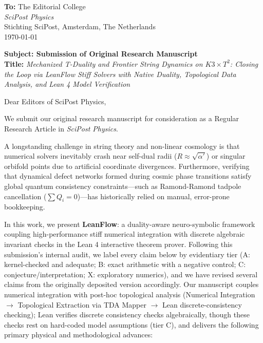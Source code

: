 \documentclass[11pt]{letter}
\begin{document}
\begin{flushleft}
\textbf{To:} The Editorial College \\
\textit{SciPost Physics} \\
Stichting SciPost, Amsterdam, The Netherlands \\
\today
\end{flushleft}

\vspace{1em}

\noindent\textbf{Subject: Submission of Original Research Manuscript} \\
\textbf{Title:} \textit{Mechanized T-Duality and Frontier String Dynamics on $K3 \times T^2$: Closing the Loop via LeanFlow Stiff Solvers with Native Duality, Topological Data Analysis, and Lean 4 Model Verification}

\vspace{1.5em}

\noindent Dear Editors of SciPost Physics,

We submit our original research manuscript for consideration as a Regular Research Article in \textit{SciPost Physics}.

A longstanding challenge in string theory and non-linear cosmology is that numerical solvers inevitably crash near self-dual radii ($R \approx \sqrt{\alpha'}$) or singular orbifold points due to artificial coordinate divergences. Furthermore, verifying that dynamical defect networks formed during cosmic phase transitions satisfy global quantum consistency constraints—such as Ramond-Ramond tadpole cancellation ($\sum Q_i = 0$)—has historically relied on manual, error-prone bookkeeping.

In this work, we present \textbf{LeanFlow}: a duality-aware neuro-symbolic framework coupling high-performance stiff numerical integration with discrete algebraic invariant checks in the Lean 4 interactive theorem prover. Following this submission's internal audit, we label every claim below by evidentiary tier (A: kernel-checked and adequate; B: exact arithmetic with a negative control; C: conjecture/interpretation; X: exploratory numerics), and we have revised several claims from the originally deposited version accordingly. Our manuscript couples numerical integration with post-hoc topological analysis (Numerical Integration $\to$ Topological Extraction via TDA Mapper $\to$ Lean discrete-consistency checking); Lean verifies discrete consistency checks algebraically, though these checks rest on hard-coded model assumptions (tier C), and delivers the following primary physical and methodological advances:
\end{document}
